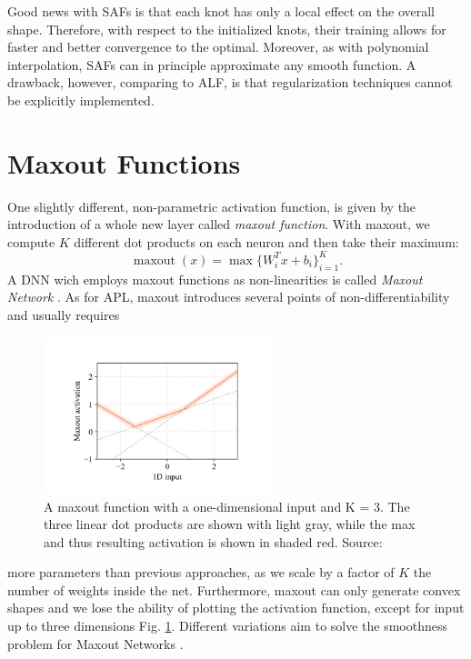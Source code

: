 \documentclass[LaM,binding=0.6cm]{./packages/sapthesis/sapthesis}
\begin{document}
    Good news with SAFs is that each knot has only a local effect on the overall shape. Therefore, with respect to the initialized knots, their training allows for faster and better convergence
    to the optimal. Moreover, as with polynomial interpolation, SAFs can in principle approximate any smooth function. A drawback, however, 
    comparing to ALF, is that regularization techniques cannot be explicitly implemented.
    \section{Maxout Functions}
    One slightly different, non-parametric activation function, is given by the introduction of a whole new layer called \textit{maxout function}. With maxout, we compute $K$ different dot products
    on each neuron and then take their maximum:
    \begin{equation}
        \operatorname{maxout}(x) = \max \{  W_i^Tx + b_i \}_{i=1}^K .
    \end{equation}
    A DNN wich employs maxout functions as non-linearities is called \textit{Maxout Network} \cite{maxout}. As for APL, maxout introduces several points of non-differentiability and usually requires 
    \begin{figure}[!h]
        \centering
        \includegraphics[width=0.6\textwidth]{maxout}
        \caption{A maxout function with a one-dimensional input and K = 3. The
        three linear dot products are shown with light gray, while the max and thus resulting activation is shown
        in shaded red. Source: \cite{kafnets}}
        \label{fig:maxout}
    \end{figure}
    more parameters than previous approaches, as we scale by a factor of $K$ the number of weights inside the net. Furthermore, maxout can only generate convex shapes and 
    we lose the ability of plotting the activation function, except for input up to three dimensions Fig. \ref{fig:maxout}.
    Different variations aim to solve the smoothness problem for Maxout Networks \cite{maxout1} \cite{maxout2}. 
\end{document}
